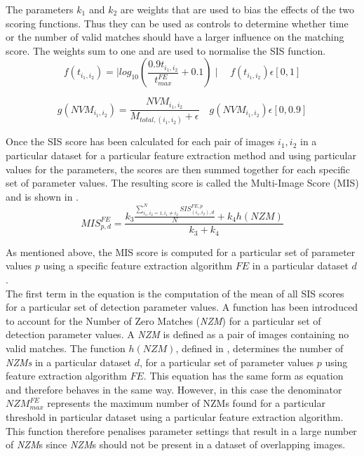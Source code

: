 \documentclass{article}
\begin{document}
The parameters $k_1$ and $k_2$ are weights that are used to bias the effects of the two scoring functions. Thus they can be used as controls to determine whether time or the number of valid matches should have a larger influence on the matching score. The weights sum to one and are used to normalise the SIS function.\\

\begin{equation}
f(t_{i_1, i_2}) = \mid log_{10}(\frac{0.9 t_{i_1, i_2}}{t_{max}^{FE}} + 0.1) \mid \quad f(t_{i_1, i_2})\epsilon [0, 1]
\label{eqn:time}
\end{equation}

\begin{equation}
g(NVM_{i_1, i_2}) = \frac{NVM_{i_1, i_2}}{M_{total, (i_1, i_2)} + \epsilon} \quad g(NVM_{i_1, i_2}) \epsilon [0, 0.9] %
\label{eqn:nvm}
\end{equation}

Once the SIS score has been calculated for each pair of images $i_1, i_2$ in a particular dataset for a particular feature extraction method and using particular values for the parameters, the scores are then summed together for each specific set of parameter values. The resulting score is called the Multi-Image Score (MIS) and is shown in .\\

\begin{equation}
MIS_{p, d}^{FE} = \frac{k_3 \frac{\sum_{i_1, i_2=1 , i_1 \neq i_2}^{N} \textit{SIS}_{(i_1, i_2),d}^{FE,p}}{N} + k_4 h(\textit{NZM})}{k_3 + k_4}
\label{eqn:mims}
\end{equation}

As mentioned above, the MIS score is computed for a particular set of parameter values $p$ using a specific feature extraction algorithm $FE$ in  a particular dataset $d$. \\

The first term in the equation is the computation of the mean of all SIS scores for a particular set of detection parameter values. A function has been introduced to account for the Number of Zero Matches (\textit{NZM}) for a particular set of detection parameter values. A \textit{NZM} is defined as a pair of images containing no valid matches. The function $h(NZM)$, defined in , determines the number of \textit{NZMs} in a particular dataset $d$, for a particular set of parameter values $p$ using feature extraction algorithm $FE$. This equation has the same form as equation  and therefore behaves in the same way. However, in this case the denominator $\textit{NZM}_{max}^{FE}$ represents the maximum number of NZMs found for a particular threshold in particular dataset using a particular feature extraction algorithm. This function therefore penalises parameter settings that result in a large number of \textit{NZM}s since \textit{NZM}s should not be present in a dataset of overlapping images. \\
\end{document}
